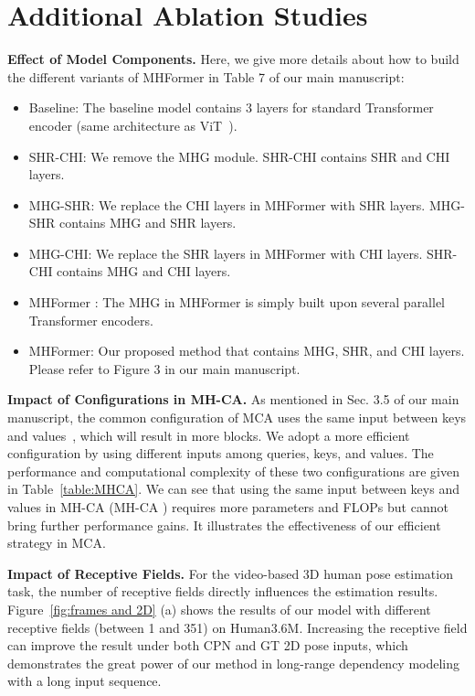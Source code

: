 \documentclass[10pt,twocolumn,letterpaper]{article}
\begin{document}
\section{Additional Ablation Studies}
\noindent
\textbf{Effect of Model Components.}
Here, we give more details about how to build the different variants of MHFormer in Table 7 of our main manuscript:
\begin{itemize}
   \item {Baseline}: The baseline model contains 3 layers for standard Transformer encoder (same architecture as ViT~\cite{dosovitskiy2020image}). 
   \item {SHR-CHI}: We remove the MHG module. SHR-CHI contains  SHR and  CHI layers. 
   \item {MHG-SHR}: We replace the CHI layers in MHFormer with SHR layers. MHG-SHR contains  MHG and  SHR layers. 
   \item {MHG-CHI}: We replace the SHR layers in MHFormer with CHI layers. SHR-CHI contains  MHG and  CHI layers. 
   \item {MHFormer }: The MHG in MHFormer is simply built upon several parallel Transformer encoders. 
   \item {MHFormer}: Our proposed method that contains  MHG,  SHR, and  CHI layers. Please refer to Figure 3 in our main manuscript. 
\end{itemize}

\noindent
\textbf{Impact of Configurations in MH-CA.}
As mentioned in Sec. 3.5 of our main manuscript, the common configuration of MCA uses the same input between keys and values~\cite{liu2021video,xu2021cdtrans,chen2021crossvit}, which will result in more blocks. 
We adopt a more efficient configuration by using different inputs among queries, keys, and values. 
The performance and computational complexity of these two configurations are given in Table~\ref{table:MHCA}. 
We can see that using the same input between keys and values in MH-CA (MH-CA ) requires more parameters and FLOPs but cannot bring further performance gains. 
It illustrates the effectiveness of our efficient strategy in MCA.

\noindent
\textbf{Impact of Receptive Fields.}
For the video-based 3D human pose estimation task, 
the number of receptive fields directly influences the estimation results. 
Figure~\ref{fig:frames and 2D} (a) shows the results of our model with different receptive fields (between 1 and 351) on Human3.6M. 
Increasing the receptive field can improve the result under both CPN and GT 2D pose inputs, which demonstrates the great power of our method in long-range dependency modeling with a long input sequence. 
\end{document}
